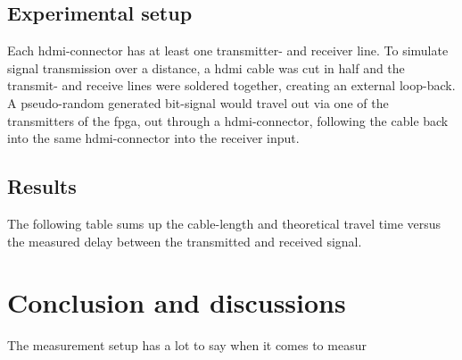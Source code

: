 \documentclass[main.tex]{subfiles}
\begin{document}
\subsection{Experimental setup}

Each \gls{hdmi}-connector has at least one transmitter- and receiver line. To simulate signal transmission over a distance, a \gls{hdmi} cable was cut in half and the transmit- and receive lines were soldered together, creating an external loop-back. A pseudo-random generated bit-signal would travel out via one of the transmitters of the \gls{fpga}, out through a \gls{hdmi}-connector, following the cable back into the same \gls{hdmi}-connector into the receiver input.

\subsection{Results}

The following table sums up the cable-length and theoretical travel time versus the measured delay between the transmitted and received signal.

\section{Conclusion and discussions}

The measurement setup has a lot to say when it comes to measur
\end{document}
